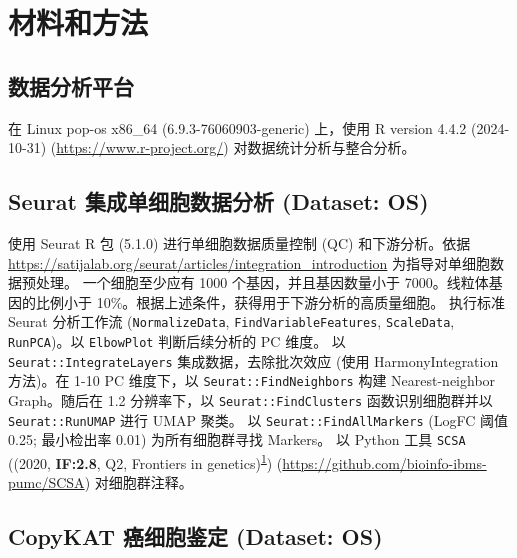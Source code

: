 \documentclass[
]{article}
\begin{document}
\begin{center}\vspace{1.5cm}\end{center}

\hypertarget{introduction}{%
\section{材料和方法}\label{introduction}}

\hypertarget{ux6570ux636eux5206ux6790ux5e73ux53f0}{%
\subsection{数据分析平台}\label{ux6570ux636eux5206ux6790ux5e73ux53f0}}

在 Linux pop-os x86\_64 (6.9.3-76060903-generic) 上，使用 R version 4.4.2 (2024-10-31) (\url{https://www.r-project.org/}) 对数据统计分析与整合分析。

\hypertarget{seurat-ux96c6ux6210ux5355ux7ec6ux80deux6570ux636eux5206ux6790-dataset-os}{%
\subsection{Seurat 集成单细胞数据分析 (Dataset: OS)}\label{seurat-ux96c6ux6210ux5355ux7ec6ux80deux6570ux636eux5206ux6790-dataset-os}}

使用 Seurat R 包 (5.1.0) 进行单细胞数据质量控制 (QC) 和下游分析。依据 \url{https://satijalab.org/seurat/articles/integration_introduction} 为指导对单细胞数据预处理。
一个细胞至少应有 1000 个基因，并且基因数量小于 7000。线粒体基因的比例小于 10\%。根据上述条件，获得用于下游分析的高质量细胞。
执行标准 Seurat 分析工作流 (\texttt{NormalizeData}, \texttt{FindVariableFeatures}, \texttt{ScaleData}, \texttt{RunPCA})。以 \texttt{ElbowPlot} 判断后续分析的 PC 维度。
以 \texttt{Seurat::IntegrateLayers} 集成数据，去除批次效应 (使用 HarmonyIntegration 方法)。在 1-10 PC 维度下，以 \texttt{Seurat::FindNeighbors} 构建 Nearest-neighbor Graph。随后在 1.2 分辨率下，以 \texttt{Seurat::FindClusters} 函数识别细胞群并以 \texttt{Seurat::RunUMAP} 进行 UMAP 聚类。
以 \texttt{Seurat::FindAllMarkers} (LogFC 阈值 0.25; 最小检出率 0.01) 为所有细胞群寻找 Markers。
以 Python 工具 \texttt{SCSA} ((2020, \textbf{IF:2.8}, Q2, Frontiers in genetics)\textsuperscript{\protect\hyperlink{ref-ScsaACellTyCaoY2020}{1}}) (\url{https://github.com/bioinfo-ibms-pumc/SCSA}) 对细胞群注释。

\hypertarget{copykat-ux764cux7ec6ux80deux9274ux5b9a-dataset-os}{%
\subsection{CopyKAT 癌细胞鉴定 (Dataset: OS)}\label{copykat-ux764cux7ec6ux80deux9274ux5b9a-dataset-os}}
\end{document}
